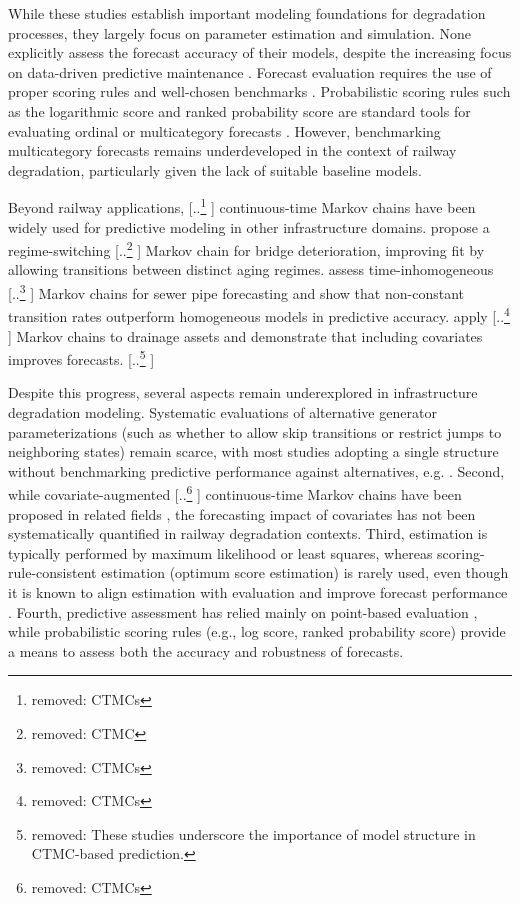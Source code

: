 \documentclass{article}
\providecommand{\DIFadd}[1]{{\protect\color{blue} \sf #1}} %
\providecommand{\DIFdel}[1]{{\protect\color{red} [..\footnote{removed: #1} ]}} %
\providecommand{\DIFaddbegin}{} %
\providecommand{\DIFaddend}{} %
\providecommand{\DIFdelbegin}{} %
\providecommand{\DIFdelend}{} %
\begin{document}
While these studies establish important modeling foundations for degradation processes, they largely focus on parameter estimation and simulation. None explicitly assess the forecast accuracy of their models, despite the increasing focus on data-driven predictive maintenance \citep{Binder2023}. Forecast evaluation requires the use of proper scoring rules \citep{Gneiting2007} and well-chosen benchmarks \citep{Hyndman2014}. Probabilistic scoring rules such as the logarithmic score and ranked probability score are standard tools for evaluating ordinal or multicategory forecasts \citep{Epstein1969,friedman1983a}. However, benchmarking multicategory forecasts remains underdeveloped in the context of railway degradation, particularly given the lack of suitable baseline models.

Beyond railway applications, \DIFdelbegin \DIFdel{CTMCs }\DIFdelend \DIFaddbegin \DIFadd{continuous-time Markov chains }\DIFaddend have been widely used for predictive modeling in other infrastructure domains. \citet{Mizutani2023RegimeSwitching} propose a regime-switching \DIFdelbegin \DIFdel{CTMC }\DIFdelend \DIFaddbegin \DIFadd{Markov chain }\DIFaddend for bridge deterioration, improving fit by allowing transitions between distinct aging regimes. \citet{JimenezRoa2024Nonhomogeneous} assess time-inhomogeneous \DIFdelbegin \DIFdel{CTMCs }\DIFdelend \DIFaddbegin \DIFadd{Markov chains }\DIFaddend for sewer pipe forecasting and show that non-constant transition rates outperform homogeneous models in predictive accuracy. \citet{Wu2021ConditionPrediction} apply \DIFdelbegin \DIFdel{CTMCs }\DIFdelend \DIFaddbegin \DIFadd{Markov chains }\DIFaddend to drainage assets and demonstrate that including covariates improves forecasts. \DIFdelbegin \DIFdel{These studies underscore the importance of model structure in CTMC-based prediction.
}\DIFdelend %

Despite this progress, several aspects remain underexplored in infrastructure degradation modeling.
Systematic evaluations of alternative generator parameterizations (such as whether to allow skip transitions or restrict jumps to neighboring states) remain scarce, with most studies adopting a single structure without benchmarking predictive performance against alternatives, e.g. \citep{bisgaard2024A,Zbiciak2025}.
Second, while covariate-augmented \DIFdelbegin \DIFdel{CTMCs }\DIFdelend \DIFaddbegin \DIFadd{continuous-time Markov chains }\DIFaddend have been proposed in related fields \citep{Wu2021ConditionPrediction}, the forecasting impact of covariates has not been systematically quantified in railway degradation contexts.
Third, estimation is typically performed by maximum likelihood or least squares, whereas scoring-rule-consistent estimation (optimum score estimation) is rarely used, even though it is known to align estimation with evaluation and improve forecast performance \citep{Gneiting2007,friedman1983a,Copas1983}.
Fourth, predictive assessment has relied mainly on point-based evaluation \citep{JimenezRoa2024Nonhomogeneous,Mizutani2023RegimeSwitching}, while probabilistic scoring rules (e.g., log score, ranked probability score) provide a means to assess both the accuracy and robustness of forecasts.
\end{document}
